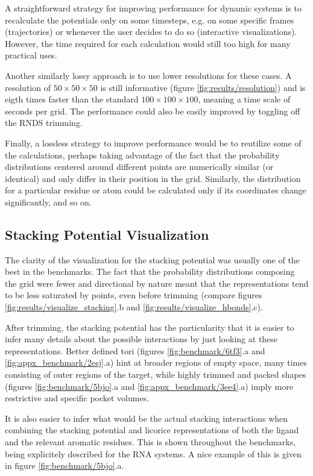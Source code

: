     A straightforward strategy for improving performance for dynamic systems is to recalculate the potentials only on some timesteps, e.g. on some specific frames (trajectories) or whenever the user decides to do so (interactive visualizations). However, the time required for each calculation would still too high for many practical uses.

    Another similarly lossy approach is to use lower resolutions for these cases. A resolution of $50 \times 50 \times 50$ is still informative (figure \ref{fig:results/resolution}) and is eigth times faster than the standard $100 \times 100 \times 100$, meaning a time scale of seconds per grid. The performance could also be easily improved by toggling off the RNDS trimming.

    Finally, a lossless strategy to improve performance would be to reutilize some of the calculations, perhaps taking advantage of the fact that the probability distributions centered around different points are numerically similar (or identical) and only differ in their position in the grid. Similarly, the distribution for a particular residue or atom could be calculated only if its coordinates change significantly, and so on.

  \subsection{Stacking Potential Visualization}
    The clarity of the visualization for the stacking potential was usually one of the best in the benchmarks. The fact that the probability distributions composing the grid were fewer and directional by nature meant that the representations tend to be less saturated by points, even before trimming (compare figures \ref{fig:results/visualize_stacking}.b and \ref{fig:results/visualize_hbonds}.c).

    After trimming, the stacking potential has the particularity that it is easier to infer many details about the possible interactions by just looking at these representations. Better defined tori (figures \ref{fig:benchmark/6tf3}.a and \ref{fig:appx_benchmark/2esj}.a) hint at broader regions of empty space, many times consisting of outer regions of the target, while highly trimmed and packed shapes (figures \ref{fig:benchmark/5bjo}.a and \ref{fig:appx_benchmark/3ee4}.a) imply more restrictive and specific pocket volumes.

    It is also easier to infer what would be the actual stacking interactions when combining the stacking potential and licorice representations of both the ligand and the relevant aromatic residues. This is shown throughout the benchmarks, being explicitely described for the RNA systems. A nice example of this is given in figure \ref{fig:benchmark/5bjo}.a.

